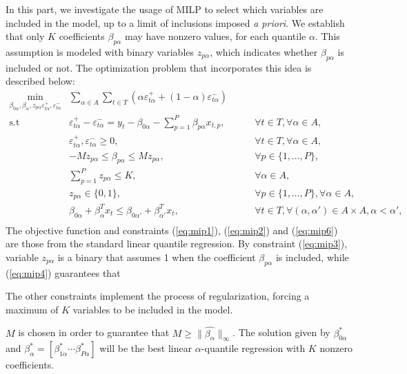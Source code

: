 In this part, we investigate the usage of MILP to select which variables are included in the model, up to a limit of inclusions imposed \textit{a priori}. We establish that only $K$ coefficients $\beta_{p\alpha}$ may have nonzero values, for each quantile $\alpha$. 
This assumption is modeled with binary variables $z_{p\alpha}$, which indicates whether $\beta_{p\alpha}$ is included or not.
The optimization problem that incorporates this idea is described below:
\begin{eqnarray}
 \underset{\beta_{0\alpha},\beta_\alpha,z_{p \alpha} \varepsilon_{t \alpha}^{+},\varepsilon_{t \alpha}^{-}}{\text{min}} & \sum_{\alpha \in A} \sum_{t\in T}\left(\alpha\varepsilon_{t \alpha}^{+}+(1-\alpha)\varepsilon_{t\alpha}^{-}\right) \label{eq:mip0} \\
\mbox{s.t } & \varepsilon_{t \alpha}^{+}-\varepsilon_{t \alpha}^{-}=y_{t}-\beta_{0 \alpha}-\sum_{p=1}^{P}\beta_{p \alpha}x_{t,p},& \qquad\forall t \in T ,\forall \alpha \in A, \label{eq:mip1}\\
& \varepsilon_{t \alpha}^{+},\varepsilon_{t \alpha}^{-}\geq0,&\qquad\forall t \in T ,\forall \alpha \in A, \label{eq:mip2}\\
& - M z_{p \alpha} \leq \beta_{p \alpha} \leq M z_{p \alpha},&\qquad\forall p\in\{1,\dots,P\}, \label{eq:mip3}\\
& \sum_{p=1}^P z_{p \alpha} \leq K, & \qquad \forall \alpha \in A, \label{eq:mip4}\\
& z_{p \alpha} \in \{0,1\},&\qquad\forall p\in\{1,\dots,P\}, \forall \alpha \in A, \label{eq:mip5}\\
& \beta_{0\alpha} + \beta_{\alpha}^T x_{t} \leq \beta_{0\alpha'} + \beta_{\alpha'}^T x_{t}, & \qquad \forall t \in T, \forall (\alpha, \alpha') \in A \times A,  \alpha < \alpha',\nonumber\\ \label{eq:mip6}
\end{eqnarray}
The objective function and constraints (\ref{eq:mip1}), (\ref{eq:mip2}) and (\ref{eq:mip6}) are those from the standard linear quantile regression. 
By constraint (\ref{eq:mip3}), variable $z_{p \alpha}$ is a binary that assumes 1 when the coefficient $\beta_{p \alpha}$ is included, while (\ref{eq:mip4}) guarantees that  


The other constraints implement the process of regularization, forcing a maximum of $K$ variables to be included in the model. 


$M$ is chosen in order to guarantee that $M \geq \|\hat{\beta_\alpha}\|_{\infty}$. The solution given by $\beta_{0\alpha}^*$ and $\beta_\alpha^* = [ \beta_{1 \alpha}^* \cdots \beta_{P\alpha}^* ]$ will be the best linear $\alpha$-quantile regression with $K$ nonzero coefficients. 

